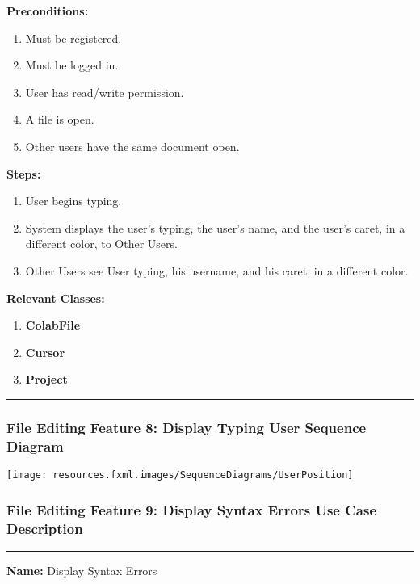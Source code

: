 \documentclass[twoside,letterpaper]{article}
\begin{document}
	\noindent\textbf{Preconditions:}
	\begin{enumerate}
		\item Must be registered.
		\item Must be logged in.
		\item User has read/write permission.
		\item A file is open.
		\item Other users have the same document open.
	\end{enumerate}
	\noindent\textbf{Steps:}
	\begin{enumerate}
		\item User begins typing.
		\item System displays the user's typing, the user's name, and the user's caret, in a different color, to Other Users.
		\item Other Users see User typing, his username, and his caret, in a different color.
	\end{enumerate}
	\noindent\textbf{Relevant Classes:}
	\begin{enumerate}
	   \item \textbf {ColabFile}
	   \item \textbf {Cursor}
	   \item \textbf {Project}
	\end{enumerate}
\vspace{8pt}
\hrule
\newpage

\subsubsection[File Editing Feature 8: Display Typing User Sequence Diagram]{\rmfamily\bfseries\color{black}
	File Editing Feature 8: Display Typing User Sequence Diagram}
\hypertarget{RefHeading22059017292}{}

\bigskip

\texttt{[image: resources.fxml.images/SequenceDiagrams/UserPosition]}

\newpage


\subsubsection[File Editing Feature 9: Display Syntax Errors]{\rmfamily\bfseries\color{black}
	File Editing Feature 9: Display Syntax Errors Use Case Description}
\hypertarget{RefHeading22059017292}{}

\vspace{2pt}
\hrule
\vspace{8pt}
	\noindent\textbf{Name:} Display Syntax Errors \newline
	
\end{document}
